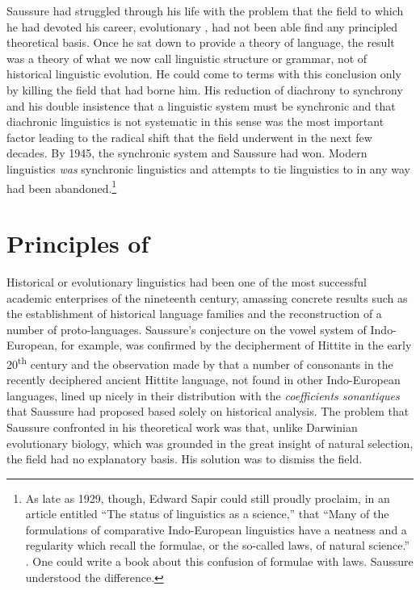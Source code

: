 \documentclass[output=paper,
modfonts
]{LSP/langsci}
\begin{document}
Saussure had struggled through his life with the problem that the field to which he had devoted his career, evolutionary , had not been able find any principled theoretical basis. Once he sat down to provide a theory of language, the result was a theory of what we now call linguistic structure or grammar, not of historical linguistic evolution. He could come to terms with this conclusion only by killing the field that had borne him. His reduction of diachrony to synchrony and his double insistence that a linguistic system must be synchronic and that diachronic linguistics is not systematic in this sense was the most important factor leading to the radical shift that the field underwent in the next few decades. By 1945, the synchronic system and Saussure had won. Modern linguistics \textit{was} synchronic linguistics and attempts to tie linguistics to  in any way had been abandoned.\footnote{As late as 1929, though, Edward Sapir could still proudly proclaim, in an article entitled ``The status of linguistics as a science,'' that ``Many of the formulations of comparative Indo-European linguistics have a neatness and a regularity which recall the formulae, or the so-called laws, of natural science.'' \citep[160]{sapir1929}. One could write a book about this confusion of formulae with laws. Saussure understood the difference.}

\section{Principles of }

Historical or evolutionary linguistics had been one of the most successful academic enterprises of the nineteenth century, amassing concrete results such as the establishment of historical language families and the reconstruction of a number of proto-languages.  Saussure's conjecture on the vowel system of Indo-European, for example, was confirmed by the decipherment of Hittite in the early 20\textsuperscript{th} century and the observation made by \citet{Kurylowicz1935} that a number of consonants in the recently deciphered ancient Hittite language, not found in other Indo-European languages, lined up nicely in their distribution with the  \textit{coefficients sonantiques} that Saussure had proposed based solely on historical analysis.  The problem that Saussure confronted in his theoretical work was that, unlike Darwinian evolutionary biology, which was grounded in the great insight of natural selection, the field had no explanatory basis. His solution was to dismiss the field.
\end{document}
